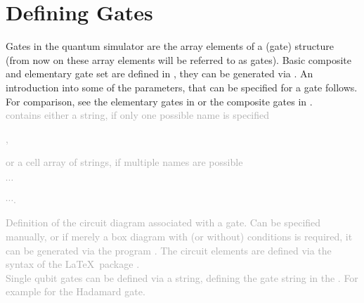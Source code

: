 \section{Defining Gates}
Gates in the quantum simulator are the array elements of a (gate) structure (from now on these array elements will be referred to as gates). Basic composite and elementary gate set are defined in , they can be generated via . An introduction into some of the parameters, that can be specified for a gate follows. For comparison, see the elementary gates in  or the composite gates in .\\

\textbf{} \textcolor{darkgray}{contains either a string, if only one possible name is specified}
\begin{center}\textcolor{darkgray}{,}\end{center} 
\textcolor{darkgray}{or a cell array of strings, if multiple names are possible}
\begin{flushleft}\textcolor{darkgray}{$\cdots$}\end{flushleft}
\vspace*{-0.2cm}\begin{flushright}\textcolor{darkgray}{$\cdots$.}\end{flushright} 

\textbf{} \textcolor{darkgray}{Definition of the circuit diagram associated with a gate. Can be specified manually, or if merely a box diagram with (or without) conditions is required, it can be generated via  the program . The circuit elements are defined via the syntax of the \LaTeX\, package . }\\

\noindent\textcolor{darkgray}{Single qubit gates can be defined via a string, defining the gate string in the . For example  for the Hadamard gate.}\\

